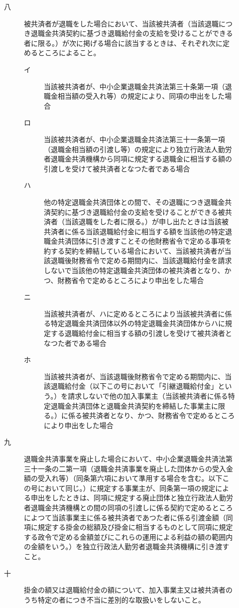 \documentclass[twocolumn,a4j,10pt]{ltjtarticle}
\begin{document}
\begin{description}
\begin{description}
\begin{description}
\end{description}
\item[八]被共済者が退職をした場合において、当該被共済者（当該退職につき退職金共済契約に基づき退職給付金の支給を受けることができる者に限る。）が次に掲げる場合に該当するときは、それぞれ次に定めるところによること。
\begin{description}
\item[イ]当該被共済者が、中小企業退職金共済法第三十条第一項（退職金相当額の受入れ等）の規定により、同項の申出をした場合
\item[ロ]当該被共済者が、中小企業退職金共済法第三十一条第一項（退職金相当額の引渡し等）の規定により独立行政法人勤労者退職金共済機構から同項に規定する退職金に相当する額の引渡しを受けて被共済者となつた者である場合
\item[ハ]他の特定退職金共済団体との間で、その退職につき退職金共済契約に基づき退職給付金の支給を受けることができる被共済者（当該退職をした者に限る。）が申し出たときは当該被共済者に係る当該退職給付金に相当する額を当該他の特定退職金共済団体に引き渡すことその他財務省令で定める事項を約する契約を締結している場合において、当該被共済者が当該退職後財務省令で定める期間内に、当該退職給付金を請求しないで当該他の特定退職金共済団体の被共済者となり、かつ、財務省令で定めるところにより申出をした場合
\item[ニ]当該被共済者が、ハに定めるところにより当該被共済者に係る特定退職金共済団体以外の特定退職金共済団体からハに規定する退職給付金に相当する額の引渡しを受けて被共済者となつた者である場合
\item[ホ]当該被共済者が、当該退職後財務省令で定める期間内に、当該退職給付金（以下この号において「引継退職給付金」という。）を請求しないで他の加入事業主（当該被共済者に係る特定退職金共済団体と退職金共済契約を締結した事業主に限る。）に係る被共済者となり、かつ、財務省令で定めるところにより申出をした場合
\end{description}
\item[九]退職金共済事業を廃止した場合において、中小企業退職金共済法第三十一条の二第一項（退職金共済事業を廃止した団体からの受入金額の受入れ等）（同条第六項において準用する場合を含む。以下この号において同じ。）に規定する事業主が、同条第一項の規定による申出をしたときは、同項に規定する廃止団体と独立行政法人勤労者退職金共済機構との間の同項の引渡しに係る契約で定めるところによつて当該事業主に係る被共済者であつた者に係る引渡金額（同項に規定する掛金の総額及び掛金に相当するものとして同項に規定する政令で定める金額並びにこれらの運用による利益の額の範囲内の金額をいう。）を独立行政法人勤労者退職金共済機構に引き渡すこと。
\item[十]掛金の額又は退職給付金の額について、加入事業主又は被共済者のうち特定の者につき不当に差別的な取扱いをしないこと。

\end{description}
\end{description}
\end{document}
